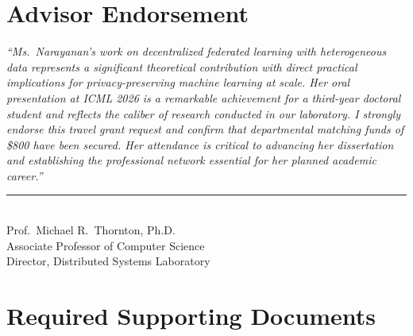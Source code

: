 \documentclass[11pt,letterpaper]{article}
\begin{document}
\section{\faPen\hspace{7pt}Advisor Endorsement}

\begin{sigbox}
\vspace{-2pt}
\textit{``Ms.\ Narayanan's work on decentralized federated learning with heterogeneous data represents a significant theoretical contribution with direct practical implications for privacy-preserving machine learning at scale. Her oral presentation at ICML 2026 is a remarkable achievement for a third-year doctoral student and reflects the caliber of research conducted in our laboratory. I strongly endorse this travel grant request and confirm that departmental matching funds of \$800 have been secured. Her attendance is critical to advancing her dissertation and establishing the professional network essential for her planned academic career.''}

\vspace{12pt}
\begin{flushright}
\begin{minipage}{0.48\textwidth}
\rule{\linewidth}{0.4pt}\\[3pt]
{\small\color{medium}Prof.\ Michael R.\ Thornton, Ph.D.}\\[1pt]
{\small\color{medium}Associate Professor of Computer Science}\\[1pt]
{\small\color{medium}Director, Distributed Systems Laboratory}
\end{minipage}
\end{flushright}
\end{sigbox}

\section{\faPaperclip\hspace{7pt}Required Supporting Documents}
\end{document}
